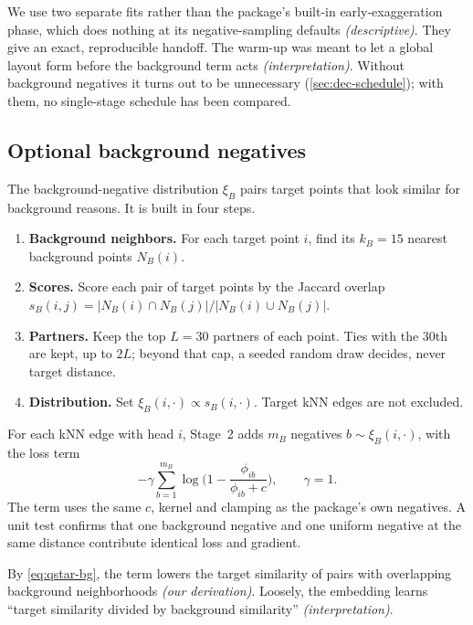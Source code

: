 \documentclass[10pt]{article}
\newcommand{\cder}{\textit{\small (our derivation)}}
\newcommand{\cdesc}{\textit{\small (descriptive)}}
\newcommand{\cinterp}{\textit{\small (interpretation)}}
\newcommand{\xiB}{\xi_{B}}
\begin{document}
We use two separate fits rather than the package's built-in early-exaggeration phase, which does nothing at its negative-sampling defaults \cdesc. They give an exact, reproducible handoff. The warm-up was meant to let a global layout form before the background term acts \cinterp. Without background negatives it turns out to be unnecessary (\cref{sec:dec-schedule}); with them, no single-stage schedule has been compared.

\subsection{Optional background negatives}
\label{sec:xib}

The background-negative distribution $\xiB$ pairs target points that look similar for background reasons. It is built in four steps.
\begin{enumerate}
  \item \textbf{Background neighbors.} For each target point $i$, find its $k_B = 15$ nearest background points $N_B(i)$.
  \item \textbf{Scores.} Score each pair of target points by the Jaccard overlap $s_B(i,j) = |N_B(i)\cap N_B(j)|/|N_B(i)\cup N_B(j)|$.
  \item \textbf{Partners.} Keep the top $L = 30$ partners of each point. Ties with the 30th are kept, up to $2L$; beyond that cap, a seeded random draw decides, never target distance.
  \item \textbf{Distribution.} Set $\xiB(i,\cdot) \propto s_B(i,\cdot)$. Target kNN edges are not excluded.
\end{enumerate}

For each kNN edge with head $i$, Stage~2 adds $m_B$ negatives $b \sim \xiB(i,\cdot)$, with the loss term
\begin{equation}
  -\gamma \sum_{b=1}^{m_B} \log\Big(1 - \frac{\phi_{ib}}{\phi_{ib}+c}\Big), \qquad \gamma = 1.
\end{equation}
The term uses the same $c$, kernel and clamping as the package's own negatives. A unit test confirms that one background negative and one uniform negative at the same distance contribute identical loss and gradient.

By \cref{eq:qstar-bg}, the term lowers the target similarity of pairs with overlapping background neighborhoods \cder. Loosely, the embedding learns ``target similarity divided by background similarity'' \cinterp.
\end{document}
